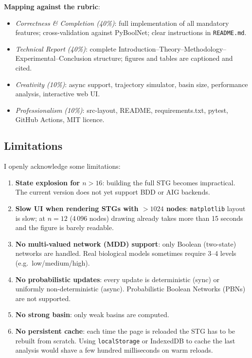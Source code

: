 \documentclass[oneside,final]{hcmut-report}
\begin{document}
\textbf{Mapping against the rubric}:
\begin{itemize}[leftmargin=*]
    \item \textit{Correctness \& Completion (40\%)}: full implementation of all mandatory features; cross-validation against PyBoolNet; clear instructions in \texttt{README.md}.
    \item \textit{Technical Report (40\%)}: complete Introduction--Theory--Methodology--Experimental--Conclusion structure; figures and tables are captioned and cited.
    \item \textit{Creativity (10\%)}: async support, trajectory simulator, basin size, performance analysis, interactive web UI.
    \item \textit{Professionalism (10\%)}: src-layout, README, requirements.txt, pytest, GitHub Actions, MIT licence.
\end{itemize}

\subsection{Limitations}\label{subsec:limitations}

I openly acknowledge some limitations:

\begin{enumerate}[leftmargin=*]
    \item \textbf{State explosion for $n > 16$}: building the full STG becomes impractical. The current version does not yet support BDD or AIG backends.
    \item \textbf{Slow UI when rendering STGs with $> 1024$ nodes}: \texttt{matplotlib} layout is slow; at $n = 12$ (4\,096 nodes) drawing already takes more than 15 seconds and the figure is barely readable.
    \item \textbf{No multi-valued network (MDD) support}: only Boolean (two-state) networks are handled. Real biological models sometimes require 3--4 levels (e.g.\ low/medium/high).
    \item \textbf{No probabilistic updates}: every update is deterministic (sync) or uniformly non-deterministic (async). Probabilistic Boolean Networks (PBNs) are not supported.
    \item \textbf{No strong basin}: only weak basins are computed.
    \item \textbf{No persistent cache}: each time the page is reloaded the STG has to be rebuilt from scratch. Using \texttt{localStorage} or IndexedDB to cache the last analysis would shave a few hundred milliseconds on warm reloads.
\end{enumerate}
\end{document}
